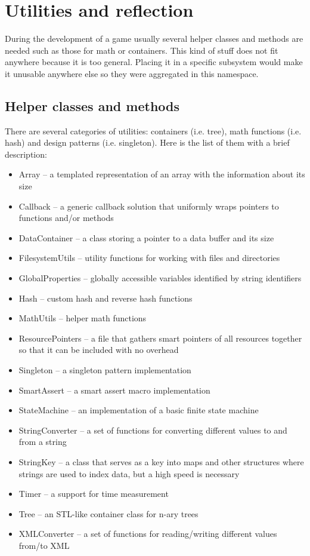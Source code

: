 \documentclass[a4paper, 12pt]{report}
\begin{document}
\chapter{Utilities and reflection}

During the development of a game usually several helper classes and methods are needed such as those for math or containers. This kind of stuff does not fit anywhere because it is too general. Placing it in a specific subsystem would make it unusable anywhere else so they were aggregated in this namespace.

\section{Helper classes and methods}
There are several categories of utilities: containers (i.e. tree), math functions (i.e. hash) and design patterns (i.e. singleton). Here is the list of them with a brief description:

\begin{itemize}
  \item Array -- a templated representation of an array with the information about its size
  \item Callback -- a generic callback solution that uniformly wraps pointers to functions and/or methods
  \item DataContainer -- a class storing a pointer to a data buffer and its size
  \item FilesystemUtils -- utility functions for working with files and directories
  \item GlobalProperties -- globally accessible variables identified by string identifiers
  \item Hash -- custom hash and reverse hash functions
  \item MathUtils -- helper math functions
  \item ResourcePointers -- a file that gathers smart pointers of all resources together so that it can be included with no overhead
  \item Singleton -- a singleton pattern implementation
  \item SmartAssert -- a smart assert macro implementation
  \item StateMachine -- an implementation of a basic finite state machine
  \item StringConverter -- a set of functions for converting different values to and from a string
  \item StringKey -- a class that serves as a key into maps and other structures where strings are used to index data, but a high speed is necessary
  \item Timer -- a support for time measurement
  \item Tree -- an STL-like container class for n-ary trees
  \item XMLConverter -- a set of functions for reading/writing different values from/to XML
\end{itemize}
\end{document}
